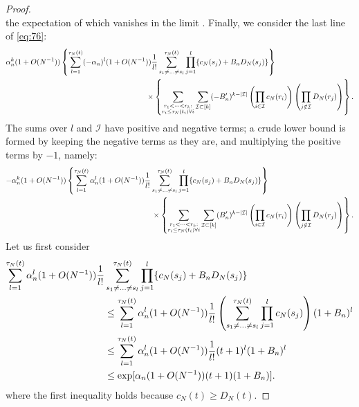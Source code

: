 \documentclass{article}
\newcommand{\1}[1]{\mathbbm{1}_{#1}}
\begin{document}
\begin{proof}
\begin{equation}
\end{equation}
the expectation of which vanishes in the limit \citep[Equation (3.5)]{brown2021}.
Finally, we consider the last line of \eqref{eq:76}:
\begin{align}
\alpha_n^k (1 + O(N^{-1}) )
&\left\{ \sum_{l=1}^{\tau_N(t)} (- \alpha_n)^l (1 + O(N^{-1}) ) \frac{1}{l!}
\sum_{s_1 \neq \dots \neq s_l}^{\tau_N(t)} \prod_{j=1}^l
\{ c_N(s_j) + B_n D_N(s_j) \} \right\} \notag\\
&\hspace{4cm}\times
\left\{ \sum_{\substack{r_1 <\dots< r_k :\\ r_i \leq \tau_N(t_i) \forall i}}
\sum_{\mathcal{I} \subset [k]} (-B_n^\prime)^{k-|\mathcal{I}|}
\left( \prod_{i\in\mathcal{I}} c_N(r_i) \right)
\left( \prod_{j\notin\mathcal{I}} D_N(r_j) \right)
\right\} .
\end{align}
The sums over $l$ and $\mathcal{I}$ have positive and negative terms; a crude lower bound is formed by keeping the negative terms as they are, and multiplying the positive terms by $-1$, namely:
\begin{align}
- \alpha_n^k (1 + O(N^{-1}) )
&\left\{ \sum_{l=1}^{\tau_N(t)} \alpha_n^l (1 + O(N^{-1}) ) \frac{1}{l!}
\sum_{s_1 \neq \dots \neq s_l}^{\tau_N(t)} \prod_{j=1}^l
\{ c_N(s_j) + B_n D_N(s_j) \} \right\} \notag\\
&\hspace{4cm}\times
\left\{ \sum_{\substack{r_1 <\dots< r_k :\\ r_i \leq \tau_N(t_i) \forall i}}
\sum_{\mathcal{I} \subset [k]} (B_n^\prime)^{k-|\mathcal{I}|}
\left( \prod_{i\in\mathcal{I}} c_N(r_i) \right)
\left( \prod_{j\notin\mathcal{I}} D_N(r_j) \right)
\right\} . \label{eq:82}
\end{align}
Let us first consider
\begin{align}
\sum_{l=1}^{\tau_N(t)} \alpha_n^l (1 + O(N^{-1}) ) \frac{1}{l!}
&\sum_{s_1 \neq \dots \neq s_l}^{\tau_N(t)} \prod_{j=1}^l
\{ c_N(s_j) + B_n D_N(s_j) \} \notag\\
&\leq \sum_{l=1}^{\tau_N(t)} \alpha_n^l (1 + O(N^{-1}) ) \frac{1}{l!}
\left( \sum_{s_1 \neq \dots \neq s_l}^{\tau_N(t)} \prod_{j=1}^l c_N(s_j) \right) (1+B_n)^l \notag\\
&\leq \sum_{l=1}^{\tau_N(t)} \alpha_n^l (1 + O(N^{-1}) ) \frac{1}{l!}
(t+1)^l (1+B_n)^l \notag\\
&\leq \exp[ \alpha_n (1 + O(N^{-1}) ) (t+1) (1+B_n) ].
\end{align}
where the first inequality holds because $c_N(t) \geq D_N(t)$.

\end{proof}
\end{document}
